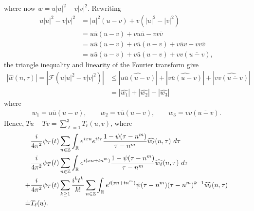 \documentclass[12pt,reqno]{amsart}
\numberwithin{equation}{section}  %
\numberwithin{figure}{section}
\newcommand{\rr}{\mathbb{R}}
\newcommand{\zz}{\mathbb{Z}}
\newcommand{\wh}{\widehat}
\theoremstyle{plain}
\theoremstyle{definition}
\theoremstyle{remark}
\begin{document}
%
where now $w = u | u |^2 - v | v |^{2}$. Rewriting
%
\begin{equation*}
	\begin{split}
		u | u |^{2} - v | v |^{2}
		& = | u |^2 \left( u -v \right) + v\left( | u 
		|^2 - | v |^2
		\right)
		\\
		& = u \bar u \left( u -v \right) + v u \bar u - v v \bar v
		\\
		& = u \bar u \left( u - v \right) + v \bar u\left( u - v \right) + v 
		\bar u v - v v \bar v
		\\
		& = u \bar u \left( u -v \right) + v \bar u\left( u - v \right) + v v 
		\left( \overline{u -v} \right),
	\end{split}
\end{equation*}
%
the triangle inequality and linearity of the Fourier transform give
%
\begin{equation*}
	\begin{split}
		| \wh{w}(n, \tau) | = | \mathcal{F}(u | u |^2 - v| v |^2) |
		& \le | \wh{u \overline{u} \left (u -v \right )} | +
		| \wh{v \overline{u} (u -v)} | + |\wh{v v 
		(\overline{u-v})}|
		\\
		& = | \wh{w_1} | + | \wh{w_2} | + | \wh{w_3} |
	\end{split}
\end{equation*}
%
where
%
\begin{equation*}
	\begin{split}
		w_1 = u \bar u \left( u -v \right), \qquad w_2 = v \bar u \left( u -v 
		\right), \qquad w_3 = v v \left( \overline{u -v} \right).
	\end{split}
\end{equation*}
%
Hence, $Tu - Tv = \sum_{\ell=1}^{3} 
T_\ell(u, v)$, where
\begin{align}
	\label{main-int-exp-mod1}
	& \frac{i}{4 \pi^2} \psi_{T}(t) \sum_{n\in \zz} \int_\rr e^{ixn}  
		e^{it \tau} \frac{ 1 - \psi(\tau - n^{m}) 
		}{\tau - n^{m}} \wh{w_\ell}(n, \tau) \ d \tau
		\\
		\label{main-int-exp-mod2}
		- & \frac{i}{4 \pi^2} \psi_{T}(t) \sum_{n\in \zz} \int_\rr e^{i(xn + 
		tn^{m})}
		 \frac{1- \psi(\tau - n^{m})}{\tau - n^{m}} \wh{w_\ell}(n, \tau) \ d \tau
		\\
		\label{main-int-exp-mod3}
		+ & \frac{i}{4 \pi^2} \psi_{T}(t) \sum_{k \ge 1} \frac{i^k t^k}{k!}
		\sum_{n \in \zz} \int_\rr e^{i(xn + tn^{m} )}
		\psi(\tau - n^{m}) (\tau - n^{m})^{k-1} \wh{w_\ell}(n, \tau)  
		\\
		\doteq & T_\ell(u). \notag
\end{align}
\end{document}
